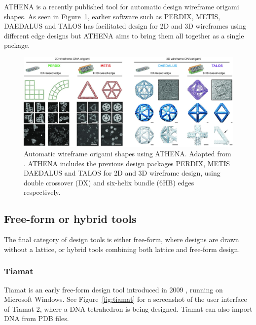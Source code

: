  ATHENA is a recently published tool for automatic design wireframe origami shapes. As seen in Figure~\ref{fig:athena}, earlier software such as PERDIX, METIS, DAEDALUS and TALOS has facilitated design for 2D and 3D wireframes using different edge designs but ATHENA aims to bring them all together as a single package.


\begin{figure}[h]
  \begin{center}
    \includegraphics[width=\textwidth]{figures/athena.jpeg}
    \caption{Automatic wireframe origami shapes using ATHENA. Adapted from \cite{athena}. ATHENA includes the previous design packages PERDIX, METIS DAEDALUS and TALOS for 2D and 3D wireframe design, using double crossover (DX) and six-helix bundle (6HB) edges respectively. }
    \label{fig:athena}
  \end{center}
\end{figure}


\subsection{Free-form or hybrid tools}
The final category of design tools is either free-form, where designs are drawn without a lattice, or hybrid tools combining both lattice and free-form design. 

\subsubsection{Tiamat}
Tiamat is an early free-form design tool introduced in 2009 \cite{Tiamat}, running on Microsoft Windows. See Figure~\ref{fig:tiamat} for a screenshot of the user interface of Tiamat 2, where a DNA tetrahedron is being designed. Tiamat can also import DNA from PDB files.

